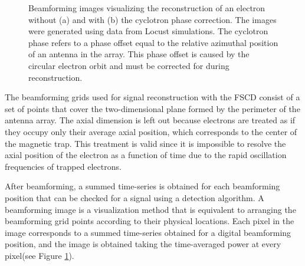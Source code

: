 \begin{figure}[htbp]
\begin{subfigure}{0.45\textwidth}
        \caption{}
    \end{subfigure}
    \caption{Beamforming images visualizing the reconstruction of an electron without (a) and with (b) the cyclotron phase correction. The images were generated using data from Locust simulations. The cyclotron phase refers to a phase offset equal to the relative azimuthal position of an antenna in the array. This phase offset is caused by the circular electron orbit and must be corrected for during reconstruction.}
    \label{fig:chap4-cyclotron-phase-bf-corr}
\end{figure}

The beamforming grids used for signal reconstruction with the FSCD consist of a set of points that cover the two-dimensional plane formed by the perimeter of the antenna array. The axial dimension is left out because electrons are treated as if they occupy only their average axial position, which corresponds to the center of the magnetic trap. This treatment is valid since it is impossible to resolve the axial position of the electron as a function of time due to the rapid oscillation frequencies of trapped electrons.

After beamforming, a summed time-series is obtained for each beamforming position that can be checked for a signal using a detection algorithm. A beamforming image is a visualization method that is equivalent to arranging the beamforming grid points according to their physical locations. Each pixel in the image corresponds to a summed time-series obtained for a digital beamforming position, and the image is obtained taking the time-averaged power at every pixel(see Figure \ref{fig:chap4-cyclotron-phase-bf-corr}).%

